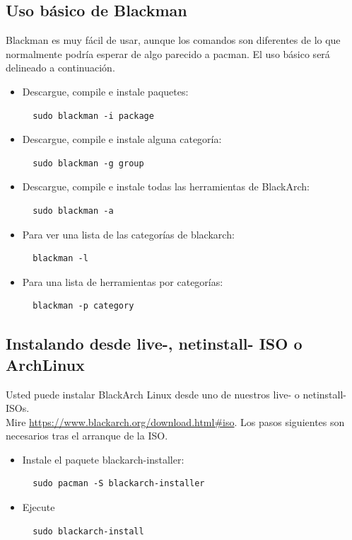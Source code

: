 \documentclass[a4paper, oneside, 11pt]{book}
\begin{document}
\subsection{Uso b\'asico de Blackman} Blackman es muy f\'acil de usar, aunque los 
comandos son diferentes de lo que normalmente podr\'ia esperar de algo parecido
a pacman. El uso b\'asico ser\'a delineado a continuaci\'on.
\begin{itemize}
\item Descargue, compile e instale paquetes:
\begin{lstlisting}
  sudo blackman -i package
\end{lstlisting}

\item Descargue, compile e instale alguna categor\'ia:
\begin{lstlisting}
  sudo blackman -g group
\end{lstlisting}

\item Descargue, compile e instale todas las herramientas de BlackArch:
\begin{lstlisting}
  sudo blackman -a
\end{lstlisting}

\item Para ver una lista de las categor\'ias de blackarch:
\begin{lstlisting}
  blackman -l
\end{lstlisting}

\item Para una lista de herramientas por categor\'ias:
\begin{lstlisting}
  blackman -p category
\end{lstlisting}

\end{itemize}

\subsection{Instalando desde live-, netinstall- ISO o ArchLinux}
Usted puede instalar BlackArch Linux desde uno de nuestros live- o netinstall-ISOs.\\Mire
\url{https://www.blackarch.org/download.html#iso}. Los pasos siguientes son necesarios
tras el arranque de la ISO.
\begin{itemize}
\item Instale el paquete blackarch-installer:
\begin{lstlisting}
  sudo pacman -S blackarch-installer
\end{lstlisting}

\item Ejecute
\begin{lstlisting}
  sudo blackarch-install
\end{lstlisting}

\end{itemize}
\end{document}
